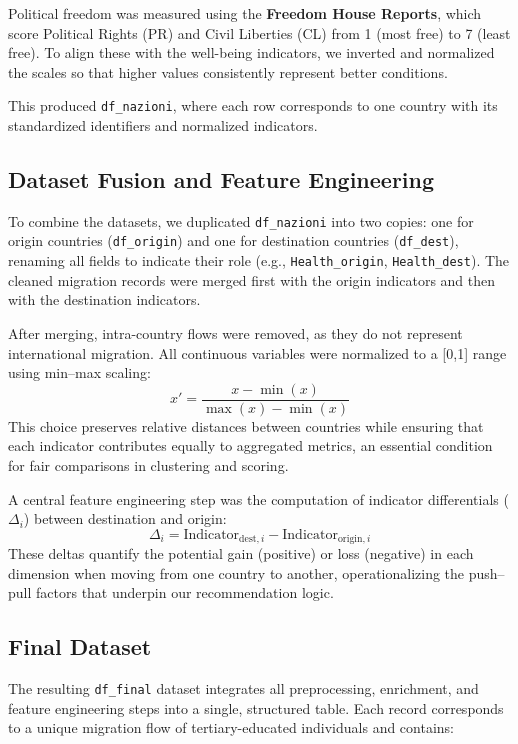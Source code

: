 \documentclass[11pt]{article}
\begin{document}
\noindent
Political freedom was measured using the \textbf{Freedom House Reports}, which score Political Rights (PR) and Civil Liberties (CL) from 1 (most free) to 7 (least free). To align these with the well-being indicators, we inverted and normalized the scales so that higher values consistently represent better conditions.

\noindent
This produced \texttt{df\_nazioni}, where each row corresponds to one country with its standardized identifiers and normalized indicators.

\subsection{Dataset Fusion and Feature Engineering}
To combine the datasets, we duplicated \texttt{df\_nazioni} into two copies: one for origin countries (\texttt{df\_origin}) and one for destination countries (\texttt{df\_dest}), renaming all fields to indicate their role (e.g., \texttt{Health\_origin}, \texttt{Health\_dest}). The cleaned migration records were merged first with the origin indicators and then with the destination indicators.

\noindent
After merging, intra-country flows were removed, as they do not represent international migration. All continuous variables were normalized to a [0,1] range using min–max scaling:
\[
x' = \frac{x - \min(x)}{\max(x) - \min(x)}
\]
This choice preserves relative distances between countries while ensuring that each indicator contributes equally to aggregated metrics, an essential condition for fair comparisons in clustering and scoring.

\noindent
A central feature engineering step was the computation of indicator differentials (\(\Delta_i\)) between destination and origin:
\[
\Delta_i = \text{Indicator}_{\text{dest}, i} - \text{Indicator}_{\text{origin}, i}
\]
These deltas quantify the potential gain (positive) or loss (negative) in each dimension when moving from one country to another, operationalizing the push–pull factors that underpin our recommendation logic.

\subsection{Final Dataset}
The resulting \texttt{df\_final} dataset integrates all preprocessing, enrichment, and feature engineering steps into a single, structured table. Each record corresponds to a unique migration flow of tertiary-educated individuals and contains:
\end{document}
